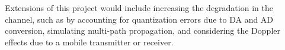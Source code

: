 \documentclass[journal]{IEEEtran}
\begin{document}
Extensions of this project would include increasing the degradation in the channel, such as by accounting for quantization errors due to D\/A and A\/D conversion, simulating multi-path propagation, and considering the Doppler effects due to a mobile transmitter or receiver.


	
\end{document}
